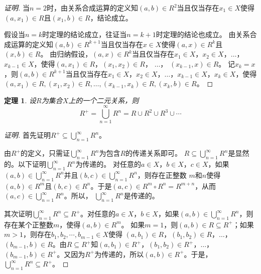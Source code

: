 \documentclass{article}
\newtheorem{Thm}{定理}
\begin{document}
\begin{CJK*}{UTF8}{gbsn}
\begin{proof}[证明]
  当$n=2$时，由关系合成运算的定义知$(a,b)\in R^2$当且仅当存在$x_1\in X$使得$(a,x_1)\in R$且$(x_1, b)\in R$，结论成立。

   假设当$n=k$时定理的结论成立，往证当$n=k+1$时定理的结论也成立。
   由关系合成运算的定义知$(a,b)\in R^{k+1}$当且仅当存在$x\in X$使得$(a,x)\in R^k$且$(x, b)\in R$。 由归纳假设，$(a,x)\in R^k$当且仅当存在$x_1\in X$，$x_2\in X$，$\ldots$，$x_{k-1}\in X$，使得$(a, x_1) \in R$，$(x_1, x_2)\in R$，  $\ldots$， $(x_{k-1}, x)\in R$。 记$x_{k}=x$，则$(a,b)\in R^{k+1}$当且仅当存在$x_1\in X$，$x_2\in X$，$\ldots$，$x_{k-1}\in X$，$x_{k}\in X$，使得$(a, x_1) \in R,(x_1, x_2)\in R,\ldots,(x_{k-1}, x_k)\in R,(x_k, b)\in R$。
\end{proof}
  \begin{Thm}
    设$R$为集合$X$上的一个二元关系，则
    \begin{equation*}
      R^+ = \bigcup_{n=1}^\infty R^n = R \cup R^2 \cup R^3 \cup \cdots 
    \end{equation*}
  \end{Thm}
  \begin{proof}[证明]
    首先证明$ R^+ \subseteq \bigcup_{n=1}^\infty R^n$。

    由$R^+$的定义，只需证$\bigcup_{n=1}^\infty R^n$为包含$R$的传递关系即可。
    $R\subseteq \bigcup_{n=1}^\infty R^n$是显然的。以下证明$\bigcup_{n=1}^\infty R^n$为传递的。
    对任意的$a\in X$，$b\in X$，$c\in X$，如果$(a,b)\in \bigcup_{n=1}^\infty R^n$并且$(b,c)\in \bigcup_{n=1}^\infty R^n$，则存在正整数
    $m$和$n$使得$(a,b)\in R^m$且$(b,c)\in R^n$。于是$(a,c)\in R^m\circ R^n = R^{m+n}$，从而$(a,c)\in \bigcup_{n=1}^\infty R^n$。所以，
    $\bigcup_{n=1}^\infty R^n$是传递的。

    其次证明$  \bigcup_{n=1}^\infty R^n\subseteq R^+$。对任意的$a\in X$，$b\in X$，如果$(a,b)\in \bigcup_{n=1}^\infty R^n$，则存在某个正整数$m$，使得$(a,b)\in R^m$。
    如果$m=1$，则$(a,b)\in R\subseteq R^+$；如果$m>1$，则存在$b_1,b_2,\cdots, b_{m-1}\in X$使得
    $(a,b_1)\in R$，$(b_1,b_2)\in R$，$\ldots$，$(b_{m-1},b)\in R$。由$R\subseteq R^+$知$(a,b_1)\in R^+$，$(b_1,b_2)\in R^+$，$\ldots$，$(b_{m-1},b)\in R^+$。又因为$R^+$为传递的，所以$(a,b)\in R^+$。于是，$ \bigcup_{n=1}^\infty R^n\subseteq R^+$。


\end{proof}
\end{CJK*}
\end{document}
